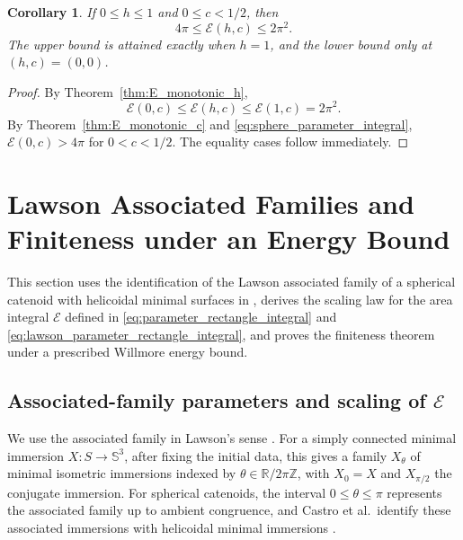 \documentclass[a4paper,11pt]{amsart}
\numberwithin{equation}{section}
\theoremstyle{plain}
\newtheorem{coro}[thm]{Corollary}
\begin{document}
\begin{coro}\label{cor:energy_bounds}
If $0\le h\le1$ and $0\le c<1/2$, then
\[
    4\pi\le \mathcal E(h,c)\le2\pi^2.
\]
The upper bound is attained exactly when $h=1$, and the lower bound only at
$(h,c)=(0,0)$.
\end{coro}

\begin{proof}
By Theorem~\ref{thm:E_monotonic_h},
\[
\mathcal E(0,c)\leq\mathcal E(h,c)\leq\mathcal E(1,c)=2\pi^2.
\]
By Theorem~\ref{thm:E_monotonic_c} and
\eqref{eq:sphere_parameter_integral},
$\mathcal E(0,c)>4\pi$ for $0<c<1/2$.
The equality cases follow immediately.
\end{proof}

\section{Lawson Associated Families and Finiteness under an Energy Bound}
\label{sec:associated_families}

This section uses the identification of the Lawson associated family of a
spherical catenoid with helicoidal minimal surfaces in
\cite[Theorem~5.6]{Castro2024}, derives the scaling law for the area integral
$\mathcal E$ defined in \eqref{eq:parameter_rectangle_integral} and
\eqref{eq:lawson_parameter_rectangle_integral}, and proves the finiteness
theorem under a prescribed Willmore energy bound.

\subsection{\texorpdfstring{Associated-family parameters and scaling of $\mathcal E$}{Associated-family parameters and scaling of E}}

We use the associated family in Lawson's sense
\cite[Section~13]{Lawson1970}. For a simply connected minimal immersion
$X:S\to\mathbb S^3$, after fixing the initial data, this gives a family
$X_\theta$ of minimal isometric immersions indexed by
$\theta\in\mathbb R/2\pi\mathbb Z$, with $X_0=X$ and
$X_{\pi/2}$ the conjugate immersion. For spherical catenoids, the interval
$0\leq\theta\leq\pi$ represents the associated family up to ambient
congruence, and Castro et al.\ identify these associated immersions with
helicoidal minimal immersions \cite[Theorem~5.6]{Castro2024}.
\end{document}
